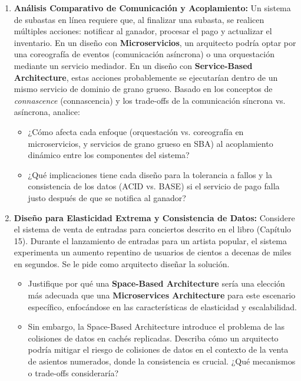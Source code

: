 \documentclass[12pt,a4paper]{article}
\begin{document}
\begin{enumerate}[label=\textbf{\arabic*.}, leftmargin=*, itemsep=1.2em]

  \item \textbf{Análisis Comparativo de Comunicación y Acoplamiento:}
  Un sistema de subastas en línea requiere que, al finalizar una subasta, se realicen múltiples acciones: notificar al ganador, procesar el pago y actualizar el inventario. En un diseño con \textbf{Microservicios}, un arquitecto podría optar por una coreografía de eventos (comunicación asíncrona) o una orquestación mediante un servicio mediador. En un diseño con \textbf{Service-Based Architecture}, estas acciones probablemente se ejecutarían dentro de un mismo servicio de dominio de grano grueso. Basado en los conceptos de \emph{connascence} (connascencia) y los trade-offs de la comunicación síncrona vs. asíncrona, analice:
  \begin{itemize}[leftmargin=1.5em]
    \item ¿Cómo afecta cada enfoque (orquestación vs. coreografía en microservicios, y servicios de grano grueso en SBA) al acoplamiento dinámico entre los componentes del sistema?
    \item ¿Qué implicaciones tiene cada diseño para la tolerancia a fallos y la consistencia de los datos (ACID vs. BASE) si el servicio de pago falla justo después de que se notifica al ganador?
  \end{itemize}

  \item \textbf{Diseño para Elasticidad Extrema y Consistencia de Datos:}
  Considere el sistema de venta de entradas para conciertos descrito en el libro (Capítulo 15). Durante el lanzamiento de entradas para un artista popular, el sistema experimenta un aumento repentino de usuarios de cientos a decenas de miles en segundos. Se le pide como arquitecto diseñar la solución.
  \begin{itemize}[leftmargin=1.5em]
    \item Justifique por qué una \textbf{Space-Based Architecture} sería una elección más adecuada que una \textbf{Microservices Architecture} para este escenario específico, enfocándose en las características de elasticidad y escalabilidad.
    \item Sin embargo, la Space-Based Architecture introduce el problema de las colisiones de datos en cachés replicadas. Describa cómo un arquitecto podría mitigar el riesgo de colisiones de datos en el contexto de la venta de asientos numerados, donde la consistencia es crucial. ¿Qué mecanismos o trade-offs consideraría?
  \end{itemize}


\end{enumerate}
\end{document}
